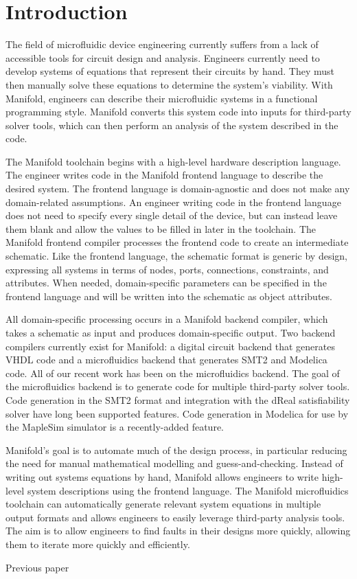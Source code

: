 \section{Introduction}

The field of microfluidic device engineering currently suffers from a lack of accessible tools for circuit design and analysis.
Engineers currently need to develop systems of equations that represent their circuits by hand.
They must then manually solve these equations to determine the system's viability.
With Manifold, engineers can describe their microfluidic systems in a functional programming style.
Manifold converts this system code into inputs for third-party solver tools, which can then perform an analysis of the system described in the code.

The Manifold toolchain begins with a high-level hardware description language.
The engineer writes code in the Manifold frontend language to describe the desired system.
The frontend language is domain-agnostic and does not make any domain-related assumptions.
An engineer writing code in the frontend language does not need to specify every single detail of the device, but can instead leave them blank and allow the values to be filled in later in the toolchain.
The Manifold frontend compiler processes the frontend code to create an intermediate schematic.
Like the frontend language, the schematic format is generic by design, expressing all systems in terms of nodes, ports, connections, constraints, and attributes.
When needed, domain-specific parameters can be specified in the frontend language and will be written into the schematic as object attributes.

All domain-specific processing occurs in a Manifold backend compiler, which takes a schematic as input and produces domain-specific output.
Two backend compilers currently exist for Manifold: a digital circuit backend that generates VHDL code and a microfluidics backend that generates SMT2 and Modelica code.
All of our recent work has been on the microfluidics backend.
The goal of the microfluidics backend is to generate code for multiple third-party solver tools.
Code generation in the SMT2 format and integration with the dReal satisfiability solver have long been supported features.
Code generation in Modelica for use by the MapleSim simulator is a recently-added feature.

Manifold's goal is to automate much of the design process, in particular reducing the need for manual mathematical modelling and guess-and-checking.
Instead of writing out systems equations by hand, Manifold allows engineers to write high-level system descriptions using the frontend language.
The Manifold microfluidics toolchain can automatically generate relevant system equations in multiple output formats and allows engineers to easily leverage third-party analysis tools.
The aim is to allow engineers to find faults in their designs more quickly, allowing them to iterate more quickly and efficiently.

Previous paper \cite{Berzish16cascon}


